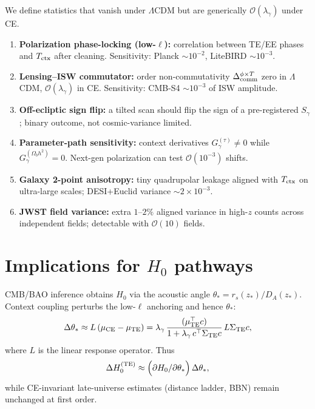 \documentclass[11pt]{article}
\begin{document}
We define statistics that vanish under $\Lambda$CDM but are generically $\mathcal O(\lambda_\gamma)$ under CE.

\begin{enumerate}[label=\textbf{P\arabic*},leftmargin=*]
\item \textbf{Polarization phase-locking (low-$\ell$):} correlation between TE/EE phases and $T_{\rm ctx}$ after cleaning. Sensitivity: Planck $\sim 10^{-2}$, LiteBIRD $\sim 10^{-3}$.
\item \textbf{Lensing--ISW commutator:} order non-commutativity $\Delta_{\rm comm}^{\phi\times T}$ zero in $\Lambda$CDM, $\mathcal O(\lambda_\gamma)$ in CE. Sensitivity: CMB-S4 $\sim 10^{-3}$ of ISW amplitude.
\item \textbf{Off-ecliptic sign flip:} a tilted scan should flip the sign of a pre-registered $S_\gamma$; binary outcome, not cosmic-variance limited.
\item \textbf{Parameter-path sensitivity:} context derivatives $G_\gamma^{(\tau)}\neq 0$ while $G_\gamma^{(\Omega_b h^2)}=0$. Next-gen polarization can test $\mathcal O(10^{-3})$ shifts.
\item \textbf{Galaxy 2-point anisotropy:} tiny quadrupolar leakage aligned with $T_{\rm ctx}$ on ultra-large scales; DESI+Euclid variance $\sim 2\times 10^{-3}$.
\item \textbf{JWST field variance:} extra $1$–$2\%$ aligned variance in high-$z$ counts across independent fields; detectable with $\mathcal O(10)$ fields.
\end{enumerate}

\section{Implications for $H_0$ pathways}
\label{sec:h0}

CMB/BAO inference obtains $H_0$ via the acoustic angle $\theta_* = r_s(z_*)/D_A(z_*)$. Context coupling perturbs the low-$\ell$ anchoring and hence $\theta_*$:
\begin{equation}
\Delta \theta_* \approx L\,(\mu_{\rm CE}-\mu_{\rm TE})
= \lambda_\gamma\,\frac{(\mu_{\rm TE}^\top c)}{1+\lambda_\gamma\, c^\top \Sigma_{\rm TE} c}\, L\Sigma_{\rm TE}c,
\end{equation}
where $L$ is the linear response operator. Thus
\begin{equation}
\Delta H_0^{\rm (TE)} \approx \Big(\partial H_0/\partial \theta_*\Big)\, \Delta \theta_*,
\end{equation}
while CE-invariant late-universe estimates (distance ladder, BBN) remain unchanged at first order.
\end{document}
